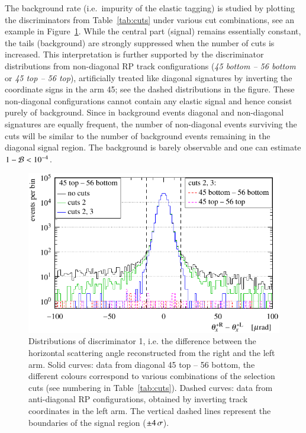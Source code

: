 The background rate (i.e.~impurity of the elastic tagging) is studied by plotting the discriminators from Table~\ref{tab:cuts} under various cut combinations, see an example in Figure~\ref{fig:tag bckg}. While the central part (signal) remains essentially constant, the tails (background) are strongly suppressed when the number of cuts is increased. This interpretation is further supported by the discriminator distributions from non-diagonal RP track configurations (\textit{45 bottom -- 56 bottom} or \textit{45 top -- 56 top}), artificially treated like diagonal signatures by inverting the coordinate signs in the arm 45; see the dashed distributions in the figure. These non-diagonal configurations cannot contain any elastic signal and hence consist purely of background. Since in background events diagonal and non-diagonal signatures are equally frequent, the number of non-diagonal events surviving the cuts will be similar to the number of background events remaining in the diagonal signal region. The background is barely observable and one can estimate $1 - {\cal B} < 10^{-4}$.


\begin{figure}
\begin{center}
\includegraphics{fig/cut_distributions.pdf}
\caption{%
Distributions of discriminator 1, i.e. the difference between the horizontal scattering angle reconstructed from the right and the left arm. Solid curves: data from diagonal 45 top -- 56 bottom, the different colours correspond to various combinations of the selection cuts (see numbering in Table~\ref{tab:cuts}). Dashed curves: data from anti-diagonal RP configurations, obtained by inverting track coordinates in the left arm. The vertical dashed lines represent the boundaries of the signal region ($\pm 4\,{\rm \sigma}$).
}
\label{fig:tag bckg}
\end{center}
\end{figure}

